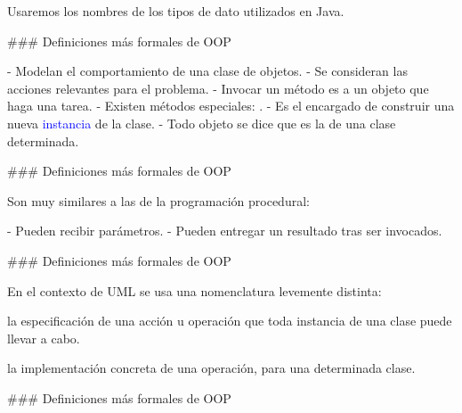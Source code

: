 \vfill

Usaremos los nombres de los tipos de dato utilizados en Java.

### Definiciones más formales de OOP


- Modelan el comportamiento de una clase de objetos.
- Se consideran las acciones relevantes para el problema.
- Invocar un método es  a un objeto que haga una tarea.
- Existen métodos especiales: .
    - Es el encargado de construir una nueva \textcolor{blue}{instancia} de la clase.
    - Todo objeto se dice que es la  de una clase determinada.

### Definiciones más formales de OOP


Son muy similares a las  de la programación procedural:

- Pueden recibir parámetros.
- Pueden entregar un resultado tras ser invocados.

### Definiciones más formales de OOP


En el contexto de UML se usa una nomenclatura levemente distinta:

\begin{description}[leftmargin=3em]
    \item[Operación:] la especificación de una acción
u operación que toda instancia de una clase puede llevar a cabo.
    \item[Método:] la implementación concreta de
una operación, para una determinada clase.
\end{description}

### Definiciones más formales de OOP


\vfill

